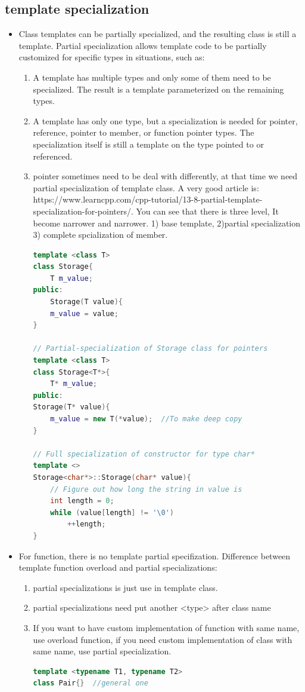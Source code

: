 \documentclass[a4paper,11pt,twoside]{book}
\begin{document}
\subsection{template specialization}
\begin{itemize}
	\item Class templates can be partially specialized, and the resulting class is still a template. Partial specialization allows template code to be partially customized for specific types in situations, such as:

	\begin{enumerate}
		\item A template has multiple types and only some of them need to be specialized. The result is a template parameterized on the remaining types.

		\item A template has only one type, but a specialization is needed for pointer, reference, pointer to member, or function pointer types. The specialization itself is still a template on the type pointed to or referenced.

		\item pointer sometimes need to be deal with differently, at that time we need partial specialization of template class. A very good article is:\\ https://www.learncpp.com/cpp-tutorial/13-8-partial-template-specialization-for-pointers/. 
		You can see that there is three level, It become narrower and narrower. 1) base template, 2)partial specialization 3) complete spcialization of member.
\begin{lstlisting}[frame=single, language=c++]
template <class T>
class Storage{
	T m_value;
public:
	Storage(T value){
	m_value = value;
}

// Partial-specialization of Storage class for pointers
template <class T>
class Storage<T*>{
	T* m_value;
public:
Storage(T* value){
	m_value = new T(*value);  //To make deep copy
}

// Full specialization of constructor for type char*
template <>
Storage<char*>::Storage(char* value){
	// Figure out how long the string in value is
	int length = 0;
	while (value[length] != '\0')
		++length;
}
\end{lstlisting}

\end{enumerate}

	\item For function, there is no template partial specifization. Difference between template function overload and partial specializations:
\begin{enumerate}
	\item partial specializations is just use in template class.
	\item partial specializations need put another <type> after class name
	\item If you want to have custom implementation of function with same name, use overload function, if you need  custom implementation of class with same name, use partial specialization.
\begin{lstlisting}[frame=single, language=c++]
template <typename T1, typename T2>
class Pair{}  //general one


\end{lstlisting}
\end{enumerate}
\end{itemize}
\end{document}
